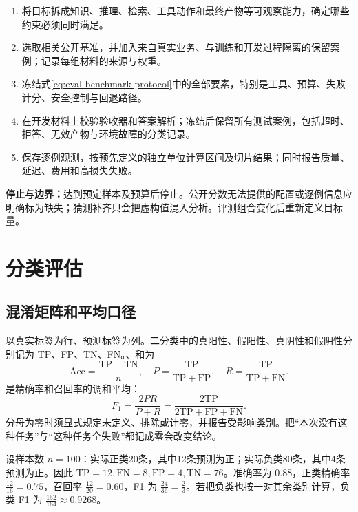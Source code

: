\documentclass[../textbook.tex]{subfiles}
\begin{document}
\begin{algorithm}[选择并冻结评测组合]
\begin{enumerate}
 \item 将目标拆成知识、推理、检索、工具动作和最终产物等可观察能力，确定哪些约束必须同时满足。
 \item 选取相关公开基准，并加入来自真实业务、与训练和开发过程隔离的保留案例；记录每组材料的来源与权重。
 \item 冻结式\eqref{eq:eval-benchmark-protocol}中的全部要素，特别是工具、预算、失败计分、安全控制与回退路径。
 \item 在开发材料上校验验收器和答案解析；冻结后保留所有测试案例，包括超时、拒答、无效产物与环境故障的分类记录。
 \item 保存逐例观测，按预先定义的独立单位计算区间及切片结果；同时报告质量、延迟、费用和高损失失败。
\end{enumerate}
\textbf{停止与边界：}达到预定样本及预算后停止。公开分数无法提供的配置或逐例信息应明确标为缺失；猜测补齐只会把虚构值混入分析。评测组合变化后重新定义目标量。
\end{algorithm}


\section{分类评估}

\subsection{混淆矩阵和平均口径}
以真实标签为行、预测标签为列。二分类中的真阳性、假阳性、真阴性和假阴性分别记为 TP、FP、TN、FN。、和为
\begin{equation}
 \mathrm{Acc}=\frac{\mathrm{TP}+\mathrm{TN}}n,\quad
 P=\frac{\mathrm{TP}}{\mathrm{TP}+\mathrm{FP}},\quad
 R=\frac{\mathrm{TP}}{\mathrm{TP}+\mathrm{FN}}.
\end{equation}
是精确率和召回率的调和平均：
\begin{equation}
 F_1=\frac{2PR}{P+R}=\frac{2\mathrm{TP}}{2\mathrm{TP}+\mathrm{FP}+\mathrm{FN}}.
 \label{eq:eval-f1}
\end{equation}
分母为零时须显式规定未定义、排除或计零，并报告受影响类别。把“本次没有这种任务”与“这种任务全失败”都记成零会改变结论。

设样本数 $n=100$：实际正类20条，其中12条预测为正；实际负类80条，其中4条预测为正。因此 $\mathrm{TP}=12,\mathrm{FN}=8,\mathrm{FP}=4,\mathrm{TN}=76$。准确率为 $0.88$，正类精确率 $\frac{12}{16}=0.75$，召回率 $\frac{12}{20}=0.60$，F1 为 $\frac{24}{36}=\frac{2}{3}$。若把负类也按一对其余类别计算，负类 F1 为 $\frac{152}{164}\approx0.9268$。
\end{document}
